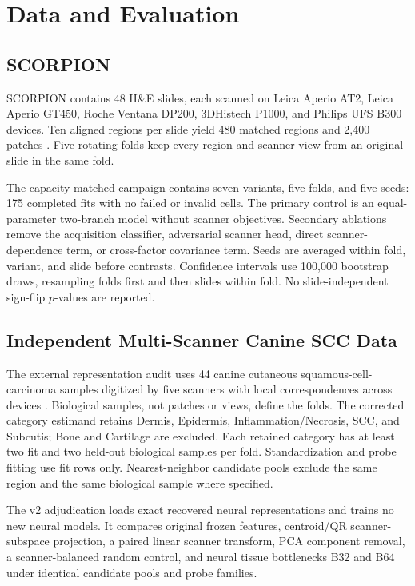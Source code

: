 \section{Data and Evaluation}
\subsection{SCORPION}
SCORPION contains 48 H\&E slides, each scanned on Leica Aperio AT2, Leica Aperio GT450, Roche Ventana DP200, 3DHistech P1000, and Philips UFS B300 devices. Ten aligned regions per slide yield 480 matched regions and 2,400 patches \citep{ryu2025scorpion}. Five rotating folds keep every region and scanner view from an original slide in the same fold.

The capacity-matched campaign contains seven variants, five folds, and five seeds: 175 completed fits with no failed or invalid cells. The primary control is an equal-parameter two-branch model without scanner objectives. Secondary ablations remove the acquisition classifier, adversarial scanner head, direct scanner-dependence term, or cross-factor covariance term. Seeds are averaged within fold, variant, and slide before contrasts. Confidence intervals use 100,000 bootstrap draws, resampling folds first and then slides within fold. No slide-independent sign-flip $p$-values are reported.

\subsection{Independent Multi-Scanner Canine SCC Data}
The external representation audit uses 44 canine cutaneous squamous-cell-carcinoma samples digitized by five scanners with local correspondences across devices \citep{wilm2023multiscanner}. Biological samples, not patches or views, define the folds. The corrected category estimand retains Dermis, Epidermis, Inflammation/Necrosis, SCC, and Subcutis; Bone and Cartilage are excluded. Each retained category has at least two fit and two held-out biological samples per fold. Standardization and probe fitting use fit rows only. Nearest-neighbor candidate pools exclude the same region and the same biological sample where specified.

The v2 adjudication loads exact recovered neural representations and trains no new neural models. It compares original frozen features, centroid/QR scanner-subspace projection, a paired linear scanner transform, PCA component removal, a scanner-balanced random control, and neural tissue bottlenecks B32 and B64 under identical candidate pools and probe families.

